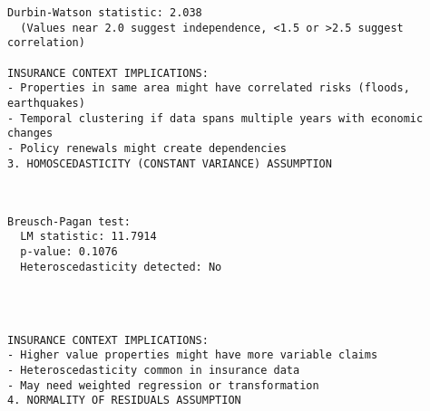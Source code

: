 \documentclass[8pt, twocolumn]{extarticle}
\begin{document}
    \begin{Verbatim}[commandchars=\\\{\}]
Durbin-Watson statistic: 2.038
  (Values near 2.0 suggest independence, <1.5 or >2.5 suggest correlation)

INSURANCE CONTEXT IMPLICATIONS:
- Properties in same area might have correlated risks (floods, earthquakes)
- Temporal clustering if data spans multiple years with economic changes
- Policy renewals might create dependencies
3. HOMOSCEDASTICITY (CONSTANT VARIANCE) ASSUMPTION
    \end{Verbatim}

    \begin{center}
    \end{center}
    { \hspace*{\fill} \\}
    
    \begin{Verbatim}[commandchars=\\\{\}]
Breusch-Pagan test:
  LM statistic: 11.7914
  p-value: 0.1076
  Heteroscedasticity detected: No
    \end{Verbatim}

    \begin{center}
    \end{center}
    { \hspace*{\fill} \\}
    
    \begin{Verbatim}[commandchars=\\\{\}]

INSURANCE CONTEXT IMPLICATIONS:
- Higher value properties might have more variable claims
- Heteroscedasticity common in insurance data
- May need weighted regression or transformation
4. NORMALITY OF RESIDUALS ASSUMPTION
    \end{Verbatim}

    \begin{center}
    \end{center}
    { \hspace*{\fill} \\}
    
\end{document}
